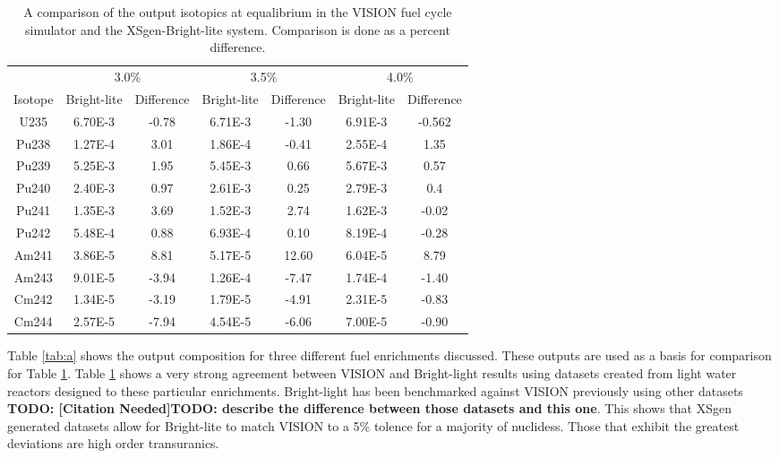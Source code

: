 \documentclass{article}
\newcommand{\TODO}[1] {{\color{red}\textbf{TODO: #1}}}
\newcommand{\citeme}{\TODO{[Citation Needed]}}
\begin{document}
\begin{table}[!htb]
\label{enrich-benchmark}
\centering
\small
\caption{A comparison of the output isotopics at equalibrium in the VISION fuel cycle simulator and the XSgen-Bright-lite system. Comparison is done as a percent difference.}
\label{tab:xsgenresults}
\vspace{0.5em}
\begin{tabular}{c cc | cc | cc }
 & \multicolumn{2}{c}{3.0\%} & \multicolumn{2}{c}{3.5\%} & \multicolumn{2}{c}{4.0\%} \\
Isotope & Bright-lite & Difference & Bright-lite & Difference & Bright-lite & Difference  \\
\hline
U235 & 6.70E-3 & -0.78 & 6.71E-3 & -1.30 & 6.91E-3 & -0.562 \\
Pu238 & 1.27E-4 & 3.01 & 1.86E-4 & -0.41 & 2.55E-4 & 1.35 \\
Pu239 & 5.25E-3 & 1.95 & 5.45E-3 & 0.66 & 5.67E-3 & 0.57 \\
Pu240 & 2.40E-3 & 0.97 & 2.61E-3 & 0.25 & 2.79E-3 & 0.4 \\
Pu241 & 1.35E-3 & 3.69 & 1.52E-3 & 2.74 & 1.62E-3 & -0.02 \\
Pu242 & 5.48E-4 & 0.88 & 6.93E-4 & 0.10 & 8.19E-4 & -0.28 \\
Am241 & 3.86E-5 & 8.81 & 5.17E-5 & 12.60 & 6.04E-5 & 8.79 \\
Am243 & 9.01E-5 & -3.94 & 1.26E-4 & -7.47 & 1.74E-4 & -1.40 \\
Cm242 & 1.34E-5 & -3.19 & 1.79E-5 & -4.91 & 2.31E-5 & -0.83 \\
Cm244 & 2.57E-5 & -7.94 & 4.54E-5 & -6.06 & 7.00E-5 & -0.90 \\
\hline
\end{tabular}
\end{table}

Table \ref{tab:a} shows the output composition for three different fuel enrichments discussed.
These outputs are used as a basis for comparison for Table \ref{tab:xsgenresults}.
Table \ref{tab:xsgenresults} shows a very strong agreement between VISION and Bright-light
results using datasets created from light water reactors designed to these particular
enrichments. Bright-light has been benchmarked against VISION previously using other datasets
\citeme \TODO{describe the difference between those datasets and this one}. This shows that
XSgen generated datasets allow for Bright-lite to match VISION to a 5\% tolence for a
majority of nuclidess. Those that exhibit the greatest deviations are high order transuranics.
\end{document}
